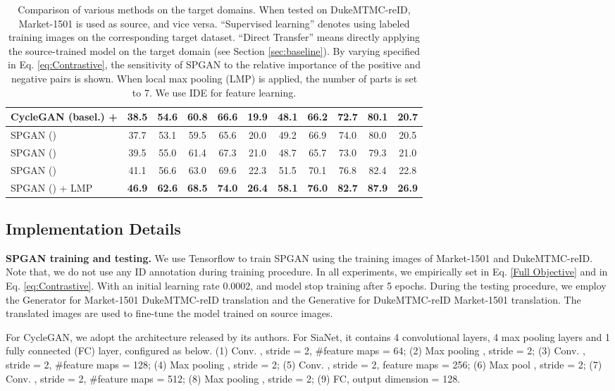 \documentclass[10pt,twocolumn,letterpaper]{article}
\begin{document}
{\begin{table*}[t]
\begin{center}
\begin{tabular}{l|ccccc|ccccc}
CycleGAN (basel.) +  &38.5&54.6&60.8&66.6&19.9&48.1&66.2&72.7&80.1&20.7\\
\hline
SPGAN () &37.7&53.1&59.5&65.6&20.0&49.2&66.9&74.0&80.0&20.5\\
SPGAN () &39.5&55.0&61.4&67.3&21.0&48.7&65.7&73.0&79.3&21.0\\
SPGAN ()&{41.1}&{56.6}&{63.0}&{69.6}&{22.3}&{51.5}&{70.1}&{76.8}&{82.4}&{22.8}\\
{SPGAN () + LMP}&\textbf{46.9}&\textbf{62.6}&\textbf{68.5}&\textbf{74.0}&\textbf{26.4}&\textbf{58.1}&\textbf{76.0}&\textbf{82.7}&\textbf{87.9}&\textbf{26.9} \\
\hline
\end{tabular}
\end{center}
\setlength{\abovecaptionskip}{0cm} 
\setlength{\belowcaptionskip}{-0.1cm} 
\caption{Comparison of various methods on the target domains. When tested on DukeMTMC-reID, Market-1501 is used as source, and vice versa. ``Supervised learning'' denotes using labeled training images on the corresponding target dataset. ``Direct Transfer'' means directly applying the source-trained model on the target domain (see Section \ref{sec:baseline}). By varying  specified in Eq. \ref{eq:Contrastive}, the sensitivity of SPGAN to the relative importance of the positive and negative pairs is shown. When local max pooling (LMP) is applied, the number of parts is set to 7. We use IDE \cite{DBLP:journals/corr/ZhengYH16}  for feature learning.} \label{Compare base}
\label{table:cmpbasl}
\end{table*}


\subsection{Implementation Details} \label{implementation detail}
\textbf{SPGAN training and testing.} We use Tensorflow \cite{tensorflow} to train SPGAN using the training images of Market-1501 and DukeMTMC-reID. Note that, we do not use any ID annotation during training procedure. In all experiments, we empirically set  in Eq. \ref{Full Objective} and  in Eq. \ref{eq:Contrastive}. With an initial learning rate 0.0002, and model stop training after 5 epochs. During the testing procedure, we employ the Generator  for Market-1501  DukeMTMC-reID translation and the Generative  for DukeMTMC-reID  Market-1501 translation. The translated images are used to fine-tune the model trained on source images.

{For CycleGAN, we adopt the architecture released by its authors. For SiaNet, it contains 4 convolutional layers, 4 max pooling layers and 1 fully connected (FC) layer, configured as below. (1) Conv. , stride = 2, \#feature maps = 64; (2) Max pooling , stride = 2; (3) Conv. , stride = 2, \#feature maps = 128; (4) Max pooling , stride = 2;  (5) Conv. , stride = 2, feature maps = 256; (6) Max pool , stride = 2; (7) Conv. , stride = 2, \#feature maps = 512; (8) Max pooling , stride = 2; (9) FC, output dimension = 128.}

}
\end{document}
